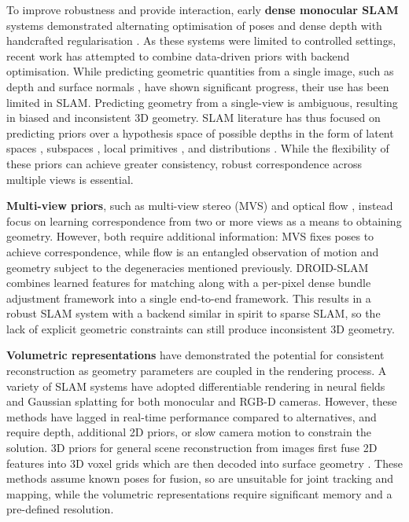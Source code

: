 \documentclass[10pt,twocolumn,letterpaper]{article}
\begin{document}
To improve robustness and provide interaction, early \textbf{dense monocular SLAM} systems demonstrated alternating optimisation of poses and dense depth with handcrafted regularisation \cite{newcombe_dtam_2011}.  As these systems were limited to controlled settings, recent work has attempted to combine data-driven priors with backend optimisation.  While predicting geometric quantities from a single image, such as depth \cite{eigen_depth_2014, ranftl_midas_2022, ke_marigold_2024, yang_depthanything_2024} and surface normals \cite{Wang_2015_CVPR, bae2024dsine}, have shown significant progress, their use has been limited in SLAM. Predicting geometry from a single-view is ambiguous, resulting in biased and inconsistent 3D geometry.  SLAM literature has thus focused on predicting priors over a hypothesis space of possible depths in the form of latent spaces \cite{bloesch_codeslam_2018, czarnowski_deepfactors_2020}, subspaces \cite{tang_ba-net_2019}, local primitives \cite{mazur_superprimitive_2024}, and distributions \cite{dexheimer_depthcov_2023, dexheimer_como_2024}.  While the flexibility of these priors can achieve greater consistency, robust correspondence across multiple views is essential.

\textbf{Multi-view priors}, such as multi-view stereo (MVS) \cite{zhou_deeptam_2018, koestler_tandem_2022, sayed2022simplerecon} and optical flow \cite{teed_raft_2020}, instead focus on learning correspondence from two or more views as a means to obtaining geometry.  However, both require additional information: MVS fixes poses to achieve correspondence, while flow is an entangled observation of motion and geometry subject to the degeneracies mentioned previously.  DROID-SLAM \cite{teed_droid_2021} combines learned features for matching along with a per-pixel dense bundle adjustment framework into a single end-to-end framework.
This results in a robust SLAM system with a backend similar in spirit to sparse SLAM, so the lack of explicit geometric constraints can still produce inconsistent 3D geometry.

\textbf{Volumetric representations} have demonstrated the potential for consistent reconstruction as geometry parameters are coupled in the rendering process.  A variety of SLAM systems have adopted differentiable rendering in neural fields \cite{mildenhall_nerf_2020} and Gaussian splatting \cite{kerbl_3d_2023} for both monocular \cite{zhu_nicer_2024, matsuki_gaussian_2024} and RGB-D \cite{sucar_imap_2021, zhu_nice_2022, keetha_splatam_2024, yan2024gs} cameras.  However, these methods have lagged in real-time performance compared to alternatives, and require depth, additional 2D priors, or slow camera motion to constrain the solution.  3D priors for general scene reconstruction from images first fuse 2D features into 3D voxel grids which are then decoded into surface geometry \cite{murez2020atlas, sun2021neucon}.  These methods assume known poses for fusion, so are unsuitable for joint tracking and mapping, while the volumetric representations require significant memory and a pre-defined resolution.
\end{document}
